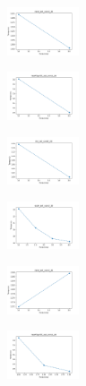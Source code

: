 \begin{figure}[H]
\begin{subfigure}
        \centering
        \includegraphics[width=0.234\textwidth]{img/copkm2/rand_set_const_20_277451237_time.png}
    \end{subfigure}
    \hfill
    \begin{subfigure}
        \centering
        \includegraphics[width=0.234\textwidth]{img/copkm2/newthyroid_set_const_20_277451237_time.png}
    \end{subfigure}
    \hfill
    \begin{subfigure}
        \centering
        \includegraphics[width=0.234\textwidth]{img/copkm2/iris_set_const_20_49258669_time.png}
    \end{subfigure}
    \hfill
    \begin{subfigure}
        \centering
        \includegraphics[width=0.234\textwidth]{img/copkm2/ecoli_set_const_20_49258669_time.png}
    \end{subfigure}
    \hfill
    \begin{subfigure}
        \centering
        \includegraphics[width=0.234\textwidth]{img/copkm2/rand_set_const_20_49258669_time.png}
    \end{subfigure}
    \hfill
    \begin{subfigure}
        \centering
        \includegraphics[width=0.234\textwidth]{img/copkm2/newthyroid_set_const_20_49258669_time.png}

\end{subfigure}
\end{figure}
